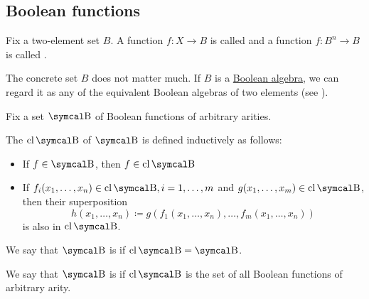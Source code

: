 \subsection{Boolean functions}\label{subsec:boolean_functions}

\begin{definition}\label{def:boolean_function}
  Fix a two-element set \( B \). A function \( f: X \to B \) is called  and a function \( f: B^n \to B \) is called .

  The concrete set \( B \) does not matter much. If \( B \) is a \hyperref[def:boolean_algebra]{Boolean algebra}, we can regard it as any of the equivalent Boolean algebras of two elements (see ).
\end{definition}

\begin{definition}\label{def:boolean_closure}
  Fix a set \( \CB \) of Boolean functions of arbitrary arities.

  The  \( \Cl{\CB} \) of \( \CB \) is defined inductively as follows:
  \begin{itemize}
    \item If \( f \in \CB \), then \( f \in \Cl{\CB} \)
    \item If \( f_i(x_1, \ldots, x_n) \in \Cl{\CB}, i = 1, \ldots, m \) and \( g(x_1, \ldots, x_m) \in \Cl{\CB} \), then their superposition
          \begin{equation*}
            h(x_1, \ldots, x_n) \coloneqq g(f_1(x_1, \ldots, x_n), \ldots, f_m(x_1, \ldots, x_n))
          \end{equation*}
          is also in \( \Cl{\CB} \).
  \end{itemize}

  We say that \( \CB \) is  if \( \Cl{\CB} = \CB \).

  We say that \( \CB \) is  if \( \Cl{\CB} \) is the set of all Boolean functions of arbitrary arity.
\end{definition}

